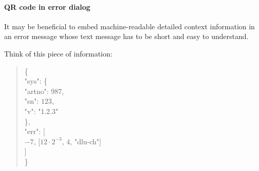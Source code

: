 \paragraph{QR code in error dialog}

It may be beneficial to embed machine-readable detailed context information in
an error message whose text message has to be short and easy to understand.

\begin{BeginParPenalty}
    Think of this piece of information:
    \begin{quote}
        \newcommand{\h}{\hspace*{\leftmargin}}
        \{ \\
            \h "sys": \{ \\
                \h\h "artno": $987$, \\
                \h\h "sn": $123$, \\
                \h\h "v": "1.2.3" \\
            \h \}, \\
            \h "err": [ \\
                \h\h $-7$, [$12 \cdot 2^{-3}$, $4$, "dlu-ch"] \\
            \h ] \\
        \}
    \end{quote}
\end{BeginParPenalty}

